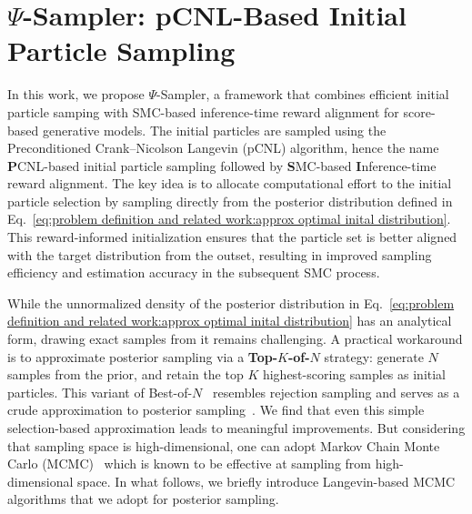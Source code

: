 \section{$\Psi$-Sampler: pCNL-Based Initial Particle Sampling}
\label{sec:methods}
In this work, we propose $\Psi$-Sampler, a framework that combines efficient initial particle samping with SMC-based inference-time reward alignment for score-based generative models. The initial particles are sampled using the Preconditioned Crank–Nicolson Langevin (pCNL) algorithm, hence the name \textbf{P}CNL-based initial particle sampling followed by \textbf{S}MC-based \textbf{I}nference-time reward alignment. The key idea is to allocate computational effort to the initial particle selection by sampling directly from the posterior distribution defined in Eq.~\ref{eq:problem definition and related work:approx optimal inital distribution}. This reward-informed initialization ensures that the particle set is better aligned with the target distribution from the outset, resulting in improved sampling efficiency and estimation accuracy in the subsequent SMC process. 

While the unnormalized density of the posterior distribution in Eq.~\ref{eq:problem definition and related work:approx optimal inital distribution} has an analytical form, drawing exact samples from it remains challenging. A practical workaround is to approximate posterior sampling via a \textbf{Top-$K$-of-$N$} strategy: generate $N$ samples from the prior, and retain the top $K$ highest-scoring samples as initial particles. This variant of Best-of-$N$~\cite{pmlr-v202-gao23h-bon, gui2024bonbon, nakano2022webgptbrowserassistedquestionansweringhuman} resembles rejection sampling and serves as a crude approximation to posterior sampling~\cite{beirami2024theoretical_bon, 10619456}.
We find that even this simple selection-based approximation leads to meaningful improvements. But considering that sampling space is high-dimensional, one can adopt Markov Chain Monte Carlo (MCMC)~\cite{metropolis_hastings, bj/1178291835, roberts2002langevin, duane1987hybrid, girolami2011riemann, Brooks_2011} which is known to be effective at sampling from high-dimensional space. In what follows, we briefly introduce Langevin-based MCMC algorithms that we adopt for posterior sampling.
